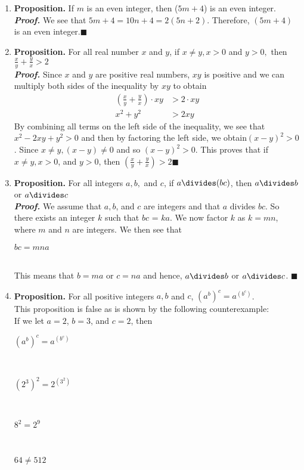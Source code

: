 \documentclass{article}
\begin{document}
\begin{enumerate}[leftmargin=35px,label=(\textbf{\alph*})]
\item \textbf{Proposition.} If $m$ is an even integer, then ($5m+4$) is an even integer.\\

\textit{\textbf{Proof.}} We see that $5m+4 = 10n+4 = 2(5n+2)$. Therefore, $(5m+4)$ is an even integer.\hfill$\blacksquare$

\item \textbf{Proposition.} For all real number $x$ and $y$, if $x \neq y, x > 0$ and $y > 0,$ then $\frac{x}{y}+\frac{y}{x} > 2$\\

\textit{\textbf{Proof.}} Since $x$ and $y$ are positive real numbers, $xy$ is positive and we can multiply both sides of the inequality by $xy$ to obtain\\
\begin{align*}
(\frac{x}{y} + \frac{y}{x}) \cdot xy &> 2 \cdot xy\\
x^2 + y^2 &> 2xy
\end{align*}
By combining all terms on the left side of the inequality, we see that $x^2 - 2xy + y^2 > 0$ and then by factoring the left side, we obtain$(x - y)^2 > 0$.
Since $x \neq y, (x - y) \neq 0$ and so $(x - y)^2 > 0$. This proves that if $x \neq y, x > 0$, and $y > 0$, then $(\frac{x}{y} + \frac{y}{x}) > 2$\hfill$\blacksquare$

\item \textbf{Proposition.} For all integers $a, b,$ and $c$, if $a \divides (bc)$, then $a \divides b$ or $a \divides c$ \\
\textit{\textbf{Proof.} } We assume that $a, b$, and $c$ are integers and that $a$ divides $bc$.
So there exists an integer $k$ such that $bc$ = $ka$. We now factor $k$ as $k = mn$, where $m$ and $n$ are integers. We then see that\\
\centerline{$bc = m n a$}\\
This means that $b = ma$ or $c = na$ and hence, $a \divides b$ or $a \divides c$. \hfill$\blacksquare$

\item \textbf{Proposition.} For all positive integers $a, b$ and $c$, $(a^b)^c = a^{(b^c)}$. \\
This proposition is false as is shown by the following counterexample:\\
If we let $a = 2$, $b = 3$, and $c = 2$, then\\
\centerline{${(a^b)}^c = a^{(b^c)}$}\\
\centerline{${(2^3)}^2 = 2^{(3^2)}$}\\
\centerline{$8^2 = 2 ^9$}\\
\centerline{$64 \neq 512$}

\end{enumerate}
\end{document}
